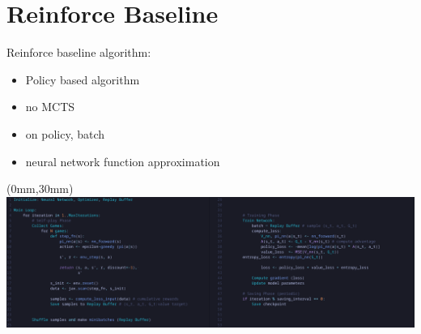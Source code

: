 \documentclass[aspectratio=169,xcolor=dvipsnames]{beamer}
\begin{document}
\section{Reinforce Baseline}

\begin{frame}{}
    Reinforce baseline algorithm:

    \medskip
    \begin{itemize}
    \item Policy based algorithm
    \item no MCTS
    \item on policy, batch
    \item neural network function approximation
\end{itemize}
\end{frame}

\begin{frame}{}
    \begin{textblock*}{\paperwidth}(0mm,30mm) %
        \includegraphics[width=\paperwidth,height=\paperheight,keepaspectratio]{reinforce.png}
    \end{textblock*}
\end{frame}
\end{document}
